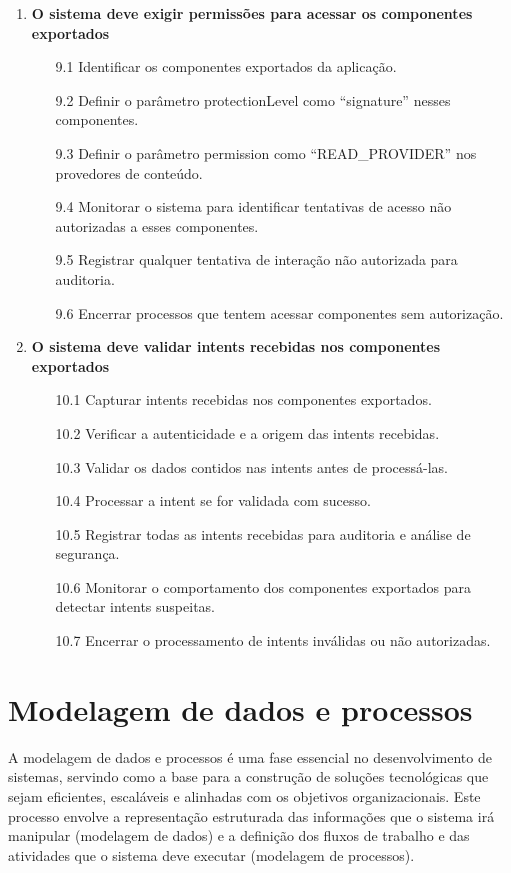 \begin{enumerate}
        \item \textbf{O sistema deve exigir permissões para acessar os componentes exportados}
        \begin{enumerate}
            \item[9.1] Identificar os componentes exportados da aplicação.
            \item[9.2] Definir o parâmetro protectionLevel como ``signature'' nesses componentes.
            \item[9.3] Definir o parâmetro permission como ``READ\_PROVIDER'' nos provedores de conteúdo.
            \item[9.4] Monitorar o sistema para identificar tentativas de acesso não autorizadas a esses componentes.
            \item[9.5] Registrar qualquer tentativa de interação não autorizada para auditoria.
            \item[9.6] Encerrar processos que tentem acessar componentes sem autorização.
        \end{enumerate}
    
        \item \textbf{O sistema deve validar intents recebidas nos componentes exportados}
        \begin{enumerate}
            \item[10.1] Capturar intents recebidas nos componentes exportados.
            \item[10.2] Verificar a autenticidade e a origem das intents recebidas.
            \item[10.3] Validar os dados contidos nas intents antes de processá-las.
            \item[10.4] Processar a intent se for validada com sucesso.
            \item[10.5] Registrar todas as intents recebidas para auditoria e análise de segurança.
            \item[10.6] Monitorar o comportamento dos componentes exportados para detectar intents suspeitas.
            \item[10.7] Encerrar o processamento de intents inválidas ou não autorizadas.
        \end{enumerate}
    
    \end{enumerate}

    
    \section{Modelagem de dados e processos}
    A modelagem de dados e processos é uma fase essencial no desenvolvimento de sistemas, servindo como a base para a construção de soluções tecnológicas que sejam eficientes, escaláveis e alinhadas com os objetivos organizacionais. Este processo envolve a representação estruturada das informações que o sistema irá manipular (modelagem de dados) e a definição dos fluxos de trabalho e das atividades que o sistema deve executar (modelagem de processos).
    
